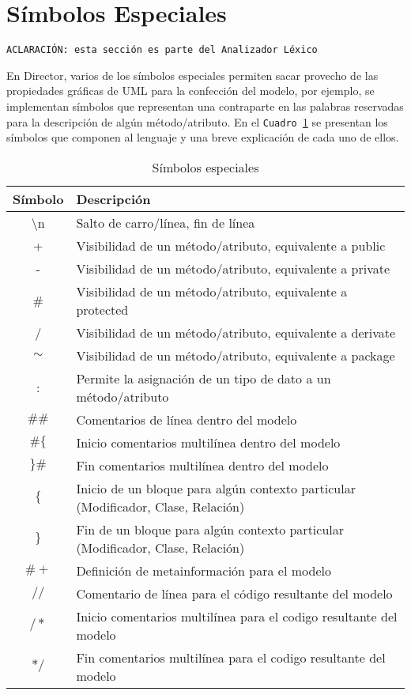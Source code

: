 \section{Símbolos Especiales}
\label{sec:simbolosespeciales}

\begin{center}
  \texttt{ACLARACIÓN: esta sección es parte del Analizador Léxico}\\
\end{center}

En Director, varios de los símbolos especiales permiten sacar provecho de las
propiedades gráficas de UML para la confección del modelo, por ejemplo, se
implementan símbolos que representan una contraparte en las palabras reservadas
para la descripción de algún método/atributo. En el \texttt{Cuadro
\ref{c:s_especiales}} se presentan los símbolos que componen al lenguaje y una
breve explicación de cada uno de ellos.

\begin{table}[H]
\centering
\caption{Símbolos especiales}
\begin{tabular}{c p{9cm} }
\hline
	Símbolo & Descripción \\ \hline
  {\textbackslash}n& Salto de carro/línea, fin de línea\\
	+ & Visibilidad de un método/atributo, equivalente a public\\
	- & Visibilidad de un método/atributo, equivalente a private\\
  \# & Visibilidad de un método/atributo, equivalente a protected\\
	/ & Visibilidad de un método/atributo, equivalente a derivate\\
$\sim$ & Visibilidad de un método/atributo, equivalente a package\\
	: & Permite la asignación de un tipo de dato a un método/atributo\\
$\#\#$ & Comentarios de línea dentro del modelo \\
$\#\{$ & Inicio comentarios multilínea dentro del modelo\\
$\}\#$ & Fin comentarios multilínea dentro del modelo\\
  $\{$ & Inicio de un bloque para algún contexto particular (Modificador,
  Clase, Relación)\\
  $\}$ & Fin de un bloque para algún contexto particular (Modificador, Clase,
  Relación)\\
$\# +$ & Definición de metainformación para el modelo\\
$//$ & Comentario de línea para el código resultante del modelo\\
$/*$ & Inicio comentarios multilínea para el codigo resultante del modelo\\
$*/$ & Fin comentarios multilínea para el codigo resultante del modelo\\ \hline
\end{tabular}
\label{c:s_especiales}
\end{table}

